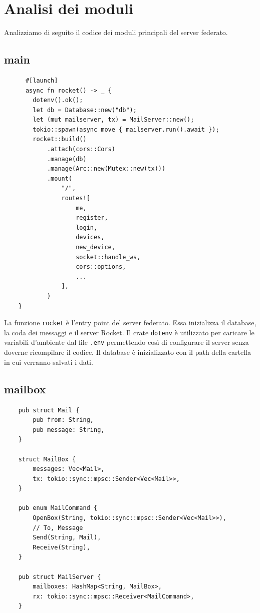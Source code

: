 \section{Analisi dei moduli}

Analizziamo di seguito il codice dei moduli principali del server federato.

\subsection{main}

\begin{listing}[H]
    \begin{verbatim}
      #[launch]
      async fn rocket() -> _ {
        dotenv().ok();
        let db = Database::new("db");
        let (mut mailserver, tx) = MailServer::new();
        tokio::spawn(async move { mailserver.run().await });
        rocket::build()
            .attach(cors::Cors)
            .manage(db)
            .manage(Arc::new(Mutex::new(tx)))
            .mount(
                "/",
                routes![
                    me,
                    register,
                    login,
                    devices,
                    new_device,
                    socket::handle_ws,
                    cors::options,
                    ...
                ],
            )
    }
    \end{verbatim}
\end{listing}

La funzione \texttt{rocket} è l'entry point del server federato. Essa inizializza il database, la coda dei messaggi e il server Rocket.
Il crate \texttt{dotenv} è utilizzato per caricare le variabili d'ambiente dal file \texttt{.env} permettendo così di configurare il server senza doverne ricompilare il codice.
Il database è inizializzato con il path della cartella in cui verranno salvati i dati.

\subsection{mailbox}

\begin{listing}[H]
    \begin{verbatim}
    pub struct Mail {
        pub from: String,
        pub message: String,
    }

    struct MailBox {
        messages: Vec<Mail>,
        tx: tokio::sync::mpsc::Sender<Vec<Mail>>,
    }

    pub enum MailCommand {
        OpenBox(String, tokio::sync::mpsc::Sender<Vec<Mail>>),
        // To, Message
        Send(String, Mail),
        Receive(String),
    }

    pub struct MailServer {
        mailboxes: HashMap<String, MailBox>,
        rx: tokio::sync::mpsc::Receiver<MailCommand>,
    }
    \end{verbatim}
\end{listing}

